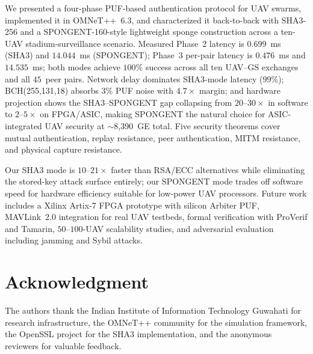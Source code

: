 \documentclass[journal,a4paper,10pt]{IEEEtran}
\begin{document}
We presented a four-phase PUF-based authentication protocol for UAV
swarms, implemented it in OMNeT++~6.3, and characterized it
back-to-back with SHA3-256 and a SPONGENT-160-style lightweight
sponge construction across a ten-UAV stadium-surveillance scenario.
Measured Phase~2 latency is $0.699$~ms (SHA3) and $14.044$~ms
(SPONGENT); Phase~3 per-pair latency is $0.476$~ms and $14.535$~ms;
both modes achieve $100\%$ success across all ten UAV--GS exchanges
and all $45$~peer pairs. Network delay dominates SHA3-mode latency
($99\%$); BCH(255,131,18) absorbs $3\%$ PUF noise with $4.7\times$
margin; and hardware projection shows the SHA3--SPONGENT gap
collapsing from $20$--$30\times$ in software to $2$--$5\times$ on
FPGA/ASIC, making SPONGENT the natural choice for ASIC-integrated
UAV security at $\sim$8{,}390~GE total. Five security theorems cover
mutual authentication, replay resistance, peer authentication, MITM
resistance, and physical capture resistance.

Our SHA3 mode is $10$--$21\times$ faster than RSA/ECC alternatives
while eliminating the stored-key attack surface entirely; our
SPONGENT mode trades off software speed for hardware efficiency
suitable for low-power UAV processors. Future work includes a
Xilinx Artix-7 FPGA prototype with silicon Arbiter PUF, MAVLink~2.0
integration for real UAV testbeds, formal verification with ProVerif
and Tamarin, $50$--$100$-UAV scalability studies, and adversarial
evaluation including jamming and Sybil attacks.


\section*{Acknowledgment}
The authors thank the Indian Institute of Information Technology
Guwahati for research infrastructure, the OMNeT++ community for the
simulation framework, the OpenSSL project for the SHA3
implementation, and the anonymous reviewers for valuable feedback.
\end{document}
